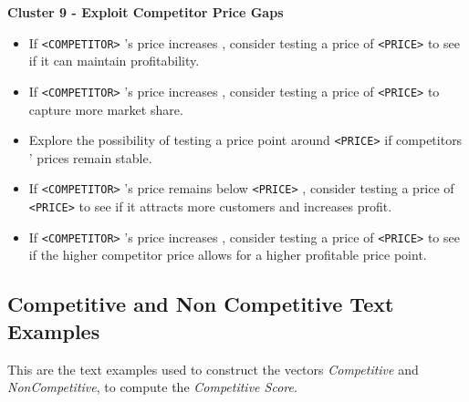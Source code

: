\textbf{Cluster 9 - Exploit Competitor Price Gaps}
\begin{itemize}
    \item If \texttt{<COMPETITOR>} 's price increases , consider testing a price of \texttt{<PRICE>} to see if it can maintain profitability.
    \item If \texttt{<COMPETITOR>} 's price increases , consider testing a price of \texttt{<PRICE>} to capture more market share.
    \item Explore the possibility of testing a price point around \texttt{<PRICE>} if competitors ' prices remain stable.
    \item If \texttt{<COMPETITOR>} 's price remains below \texttt{<PRICE>} , consider testing a price of \texttt{<PRICE>} to see if it attracts more customers and increases profit.
    \item If \texttt{<COMPETITOR>} 's price increases , consider testing a price of \texttt{<PRICE>} to see if the higher competitor price allows for a higher profitable price point.
\end{itemize}


\subsection*{Competitive and Non Competitive Text Examples}\label{app:text_examples_comp_score}
This are the text examples used to construct the vectors \textit{Competitive} and \textit{NonCompetitive}, to compute the \textit{Competitive Score}.

